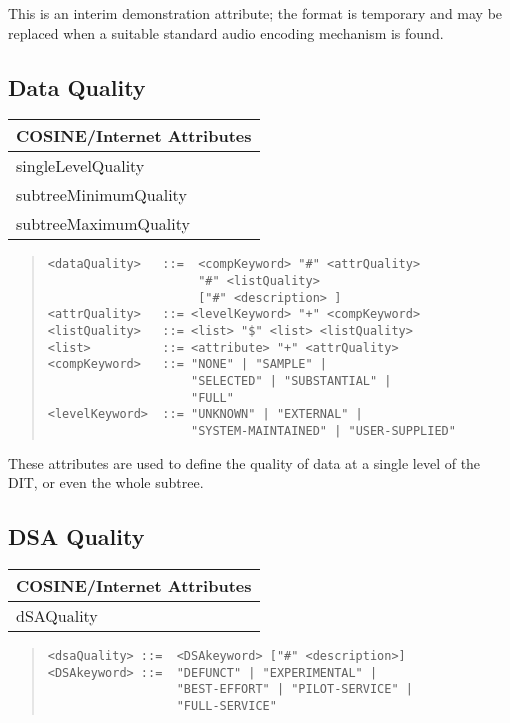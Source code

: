 This is an interim demonstration attribute; the format is
temporary and may be replaced when a suitable standard 
audio encoding mechanism is found.

\subsection{Data Quality}
\begin{center}\small
\begin{tabular}{|l|}\hline
COSINE/Internet Attributes \\ \hline
	singleLevelQuality\\
	subtreeMinimumQuality\\
	subtreeMaximumQuality\\
\hline
\end{tabular}
\end{center}

\begin{quote}\begin{verbatim}
<dataQuality>   ::=  <compKeyword> "#" <attrQuality>
                     "#" <listQuality>
                     ["#" <description> ]
<attrQuality>   ::= <levelKeyword> "+" <compKeyword>
<listQuality>   ::= <list> "$" <list> <listQuality>
<list>          ::= <attribute> "+" <attrQuality>
<compKeyword>   ::= "NONE" | "SAMPLE" |
                    "SELECTED" | "SUBSTANTIAL" |
                    "FULL" 
<levelKeyword>  ::= "UNKNOWN" | "EXTERNAL" | 
                    "SYSTEM-MAINTAINED" | "USER-SUPPLIED" 
\end{verbatim}\end{quote}

These attributes are used to define the quality of data at a single
level of the DIT, or even the whole subtree.

\subsection{DSA Quality}
\begin{center}\small
\begin{tabular}{|l|}\hline
COSINE/Internet Attributes \\ \hline
	dSAQuality\\
\hline
\end{tabular}
\end{center}

\begin{quote}\begin{verbatim}
<dsaQuality> ::=  <DSAkeyword> ["#" <description>]
<DSAkeyword> ::=  "DEFUNCT" | "EXPERIMENTAL" |
                  "BEST-EFFORT" | "PILOT-SERVICE" |
                  "FULL-SERVICE"
\end{verbatim}\end{quote}

